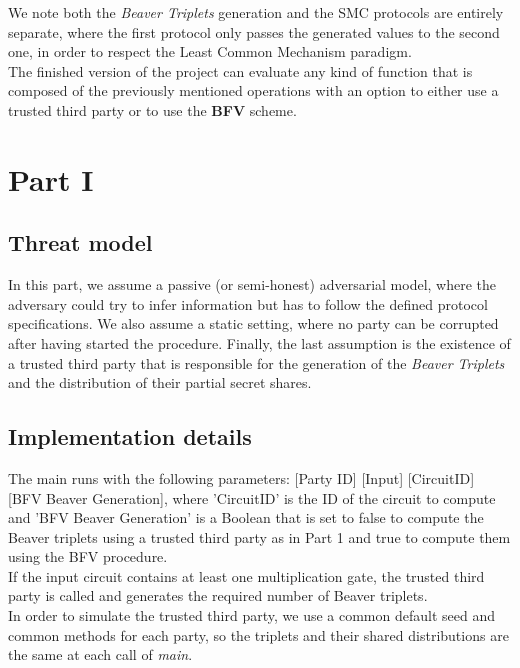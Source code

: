 \documentclass[10pt,conference,compsocconf]{IEEEtran}
\begin{document}
We note both the \textit{Beaver Triplets} generation and the SMC protocols are entirely separate, where the first protocol only passes the generated values to the second one, in order to respect the Least Common Mechanism paradigm. \\

The finished version of the project can evaluate any kind of function that is composed of the previously mentioned operations with an option to either use a trusted third party or to use the \textbf{BFV} scheme.
\section{Part I}

\subsection{Threat model}
In this part, we assume a passive (or semi-honest) adversarial model, where the adversary could try to infer information but has to follow the defined protocol specifications. We also assume a static setting, where no party can be corrupted after having started the procedure. Finally, the last assumption is the existence of a trusted third party that is responsible for the generation of the \textit{Beaver Triplets} and the distribution of their partial secret shares. \\ 


\subsection{Implementation details}



The main runs with the following parameters: [Party ID] [Input] [CircuitID] [BFV Beaver Generation], where 'CircuitID' is the ID of the circuit to compute and 'BFV Beaver Generation' is a Boolean that is set to false to compute the Beaver triplets using a trusted third party as in Part 1 and true to compute them using the BFV procedure.\\

If the input circuit contains at least one multiplication gate, the trusted third party is called and generates the required number of Beaver triplets. \\

In order to simulate the trusted third party, we use a common default seed and common methods for each party, so the triplets and their shared distributions are the same at each call of \textit{main}. 
\end{document}
